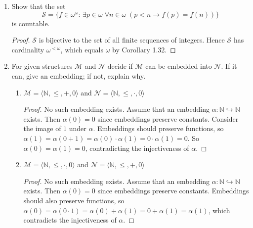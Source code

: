\documentclass{article}
\begin{document}
\begin{enumerate}
\begin{proof}
      \begin{enumerate}
        \item Let $g_0$ be the sequence of $0$'s of length $f(0)$.
        \item Given $g_n$, let $g_{n+1}$ be $g_n$ concatenated with a
          sequence of bits of length $f(n+1)-f(n)$, where we choose all the
          bits to be 0 if $n+1$ is even and 1 if $n+1$ is odd.
      \end{enumerate}

      It is routine to verify that $\theta$ is a bijection, hence
      $\mathcal{S}$ has the same cardinality as $2^\omega$. 
    \end{proof}

  \item Show that the set
    \begin{equation*}
      \mathcal{S}=\{f\in\omega^\omega:\, \exists p\in\omega\; \forall
      n\in\omega\; (p<n\rightarrow f(p)=f(n))\}
    \end{equation*}
    is countable.

    \begin{proof}
      $\mathcal{S}$ is bijective to the set of all finite sequences of
      integers. Hence $\mathcal{S}$ has cardinality $\omega^{<\omega}$,
      which equals $\omega$ by Corollary 1.32.
    \end{proof}

  \item For given structures $\mathcal{M}$ and $\mathcal{N}$ decide if
    $\mathcal{M}$ can be embedded into $\mathcal{N}$. If it can, give an
    embedding; if not, explain why.

    \begin{enumerate}
      \item $\mathcal{M}=\langle\mathbb{N},\leq,+,0\rangle$ and
        $\mathcal{N}=\langle\mathbb{N},\leq,\cdot,0\rangle$
        \begin{proof}
          No such embedding exists. Assume that an embedding
          $\alpha:\mathbb{N}\hookrightarrow\mathbb{N}$ exists. Then
          $\alpha(0)=0$ since embeddings preserve constants. Consider the
          image of $1$ under $\alpha$. Embeddings should preserve
          functions, so
          $\alpha(1)=\alpha(0+1)=\alpha(0)\cdot\alpha(1)=0\cdot\alpha(1)=0$.
          So $\alpha(0)=\alpha(1)=0$, contradicting the injectiveness of
          $\alpha$.
        \end{proof}

      \item $\mathcal{M}=\langle\mathbb{N},\leq,\cdot,0\rangle$ and
        $\mathcal{N}=\langle\mathbb{N},\leq,+,0\rangle$
        \begin{proof}
          No such embedding exists. Assume that an embedding
          $\alpha:\mathbb{N}\hookrightarrow\mathbb{N}$ exists. Then
          $\alpha(0)=0$ since embeddings preserve constants. Embeddings
          should also preserve functions, so
          $\alpha(0)=\alpha(0\cdot1)=\alpha(0)+\alpha(1)=0+\alpha(1)=\alpha(1)$,
          which contradicts the injectiveness of $\alpha$.
        \end{proof}


\end{enumerate}
\end{enumerate}
\end{document}

